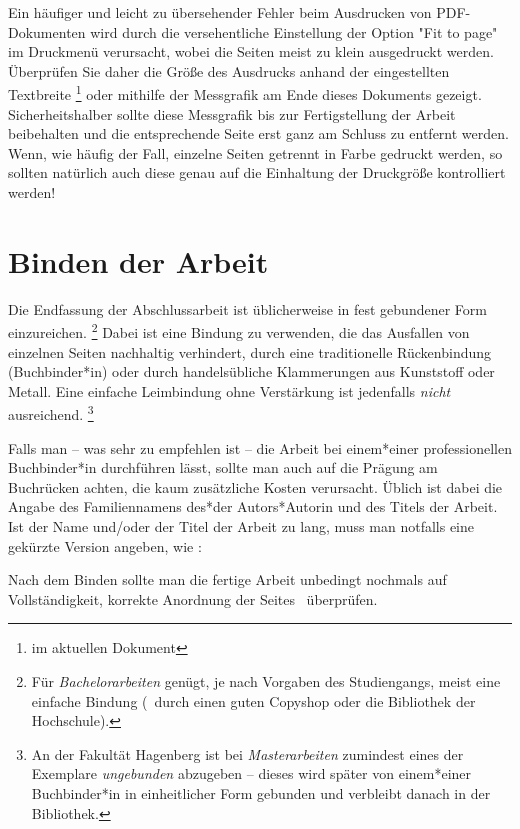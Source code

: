 Ein häufiger und leicht zu übersehender Fehler beim Ausdrucken von
PDF-Doku\-menten wird durch die versehentliche Einstellung der Option "Fit to
page" im Druckmenü verursacht, wobei die Seiten meist zu klein ausgedruckt
werden. Überprüfen Sie daher die Größe des Ausdrucks anhand der eingestellten
Textbreite%
\footnote{\Convert[unit=mm]{\the\textwidth}	im aktuellen Dokument} %
oder mithilfe der Messgrafik am Ende dieses Dokuments gezeigt.
Sicherheitshalber sollte diese Messgrafik bis zur Fertigstellung der
Arbeit beibehalten und die entsprechende Seite erst ganz am Schluss zu
entfernt werden. Wenn, wie häufig der Fall, einzelne Seiten getrennt in Farbe
gedruckt werden, so sollten natürlich auch diese genau auf die Einhaltung der
Druckgröße kontrolliert werden!


\section{Binden der Arbeit}

Die Endfassung der Abschlussarbeit ist üblicherweise in fest gebundener Form
einzureichen.%
\footnote{Für \emph{Bachelorarbeiten} genügt, je nach Vorgaben des
Studiengangs, meist eine einfache Bindung (\zB\ durch einen guten Copyshop
oder die Bibliothek der Hochschule).}
Dabei ist eine Bindung zu verwenden, die das Ausfallen von einzelnen Seiten
nachhaltig verhindert, \zB durch eine traditionelle Rückenbindung
(Buchbinder*in) oder durch handelsübliche Klammerungen aus Kunststoff oder
Metall. Eine einfache Leimbindung ohne Verstärkung ist jedenfalls
\emph{nicht} ausreichend.%
\footnote{An der Fakultät Hagenberg ist bei \emph{Masterarbeiten} zumindest
eines der Exemplare \emph{ungebunden} abzugeben -- dieses wird später von
einem*einer Buchbinder*in in einheitlicher Form gebunden und verbleibt danach
in der Bibliothek.}

Falls man -- was sehr zu empfehlen ist -- die Arbeit bei einem*einer
professionellen Buchbinder*in durchführen lässt, sollte man auch auf die
Prägung am Buchrücken achten, die kaum zusätzliche Kosten verursacht. Üblich
ist dabei die Angabe des Familiennamens des*der Autors*Autorin und des Titels
der Arbeit. Ist der Name und/oder der Titel der Arbeit zu lang, muss man 
notfalls eine gekürzte Version angeben, wie \zB:
%
\begin{center}
	\setlength{\fboxsep}{3mm}
\end{center}
%
Nach dem Binden sollte man die fertige Arbeit unbedingt nochmals auf 
Vollständigkeit, korrekte Anordnung der Seites \etc\ überprüfen.



